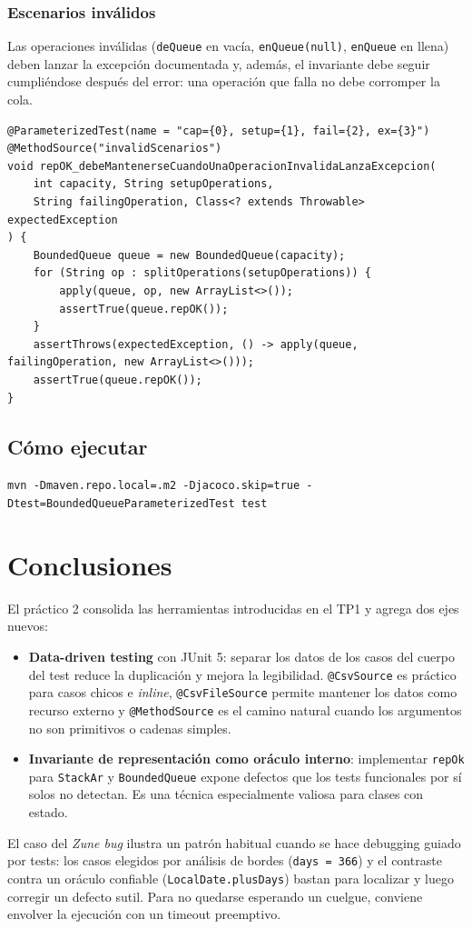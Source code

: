 \documentclass[12pt,a4paper]{article}
\begin{document}
\subsubsection*{Escenarios inválidos}
Las operaciones inválidas (\texttt{deQueue} en vacía, \texttt{enQueue(null)}, \texttt{enQueue} en llena) deben lanzar la excepción documentada y, además, el invariante debe seguir cumpliéndose después del error: una operación que falla no debe corromper la cola.

\begin{lstlisting}[style=javastyle]
@ParameterizedTest(name = "cap={0}, setup={1}, fail={2}, ex={3}")
@MethodSource("invalidScenarios")
void repOK_debeMantenerseCuandoUnaOperacionInvalidaLanzaExcepcion(
    int capacity, String setupOperations,
    String failingOperation, Class<? extends Throwable> expectedException
) {
    BoundedQueue queue = new BoundedQueue(capacity);
    for (String op : splitOperations(setupOperations)) {
        apply(queue, op, new ArrayList<>());
        assertTrue(queue.repOK());
    }
    assertThrows(expectedException, () -> apply(queue, failingOperation, new ArrayList<>()));
    assertTrue(queue.repOK());
}
\end{lstlisting}

\subsection{Cómo ejecutar}
\begin{center}
\texttt{mvn -Dmaven.repo.local=.m2 -Djacoco.skip=true -Dtest=BoundedQueueParameterizedTest test}
\end{center}

\newpage
\section*{Conclusiones}
El práctico 2 consolida las herramientas introducidas en el TP1 y agrega dos ejes nuevos:
\begin{itemize}
  \item \textbf{Data-driven testing} con JUnit 5: separar los datos de los casos del cuerpo del test reduce la duplicación y mejora la legibilidad. \texttt{@CsvSource} es práctico para casos chicos e \textit{inline}, \texttt{@CsvFileSource} permite mantener los datos como recurso externo y \texttt{@MethodSource} es el camino natural cuando los argumentos no son primitivos o cadenas simples.
  \item \textbf{Invariante de representación como oráculo interno}: implementar \texttt{repOk} para \texttt{StackAr} y \texttt{BoundedQueue} expone defectos que los tests funcionales por sí solos no detectan. Es una técnica especialmente valiosa para clases con estado.
\end{itemize}

El caso del \textit{Zune bug} ilustra un patrón habitual cuando se hace debugging guiado por tests: los casos elegidos por análisis de bordes (\texttt{days = 366}) y el contraste contra un oráculo confiable (\texttt{LocalDate.plusDays}) bastan para localizar y luego corregir un defecto sutil. Para no quedarse esperando un cuelgue, conviene envolver la ejecución con un timeout preemptivo.
\end{document}
